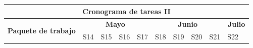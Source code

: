 \begin{table}[h!]
    \centering
    \footnotesize
    \setlength{\tabcolsep}{3pt}
    \begin{tabular}{|c|l|c|c|c|c|c|c|c|c|c|c|}
        \hline
        \multicolumn{12}{|c|}{\textbf{Cronograma de tareas II}}                                                                                                                                                                                                                                                                                   \\
        \hline
        \multicolumn{2}{|c|}{\multirow{2}{*}{\textbf{Paquete de trabajo}}}
                               & \multicolumn{4}{|c|}{\textbf{Mayo}}
                               & \multicolumn{4}{|c|}{\textbf{Junio}}
                               & \multicolumn{2}{|c|}{\textbf{Julio}}                                                                                                                                                                                                                                                                             \\
        \cline{3-12}
        \multicolumn{2}{|c|}{} & S13                                      & S14                   & S15                                        & S16                   & S17                   & S18                   & S19                   & S20                   & S21                   & S22                \\
        \hline


\end{tabular}
\end{table}
